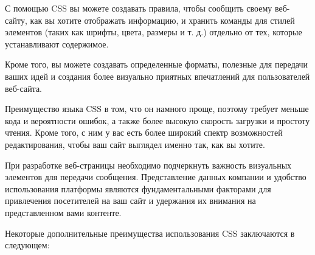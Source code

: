 С помощью CSS вы можете создавать правила, чтобы сообщить своему веб-сайту, как вы хотите отображать информацию, и хранить команды для стилей элементов (таких как шрифты, цвета, размеры и т. д.) отдельно от тех, которые устанавливают содержимое.

Кроме того, вы можете создавать определенные форматы, полезные для передачи ваших идей и создания более визуально приятных впечатлений для пользователей веб-сайта.

Преимущество языка CSS в том, что он намного проще, поэтому требует меньше кода и вероятности ошибок, а также более высокую скорость загрузки и простоту чтения. Кроме того, с ним у вас есть более широкий спектр возможностей редактирования, чтобы ваш сайт выглядел именно так, как вы хотите.

При разработке веб-страницы необходимо подчеркнуть важность визуальных элементов для передачи сообщения. Представление данных компании и удобство использования платформы являются фундаментальными факторами для привлечения посетителей на ваш сайт и удержания их внимания на представленном вами контенте. 

Некоторые дополнительные преимущества использования CSS заключаются в следующем:

